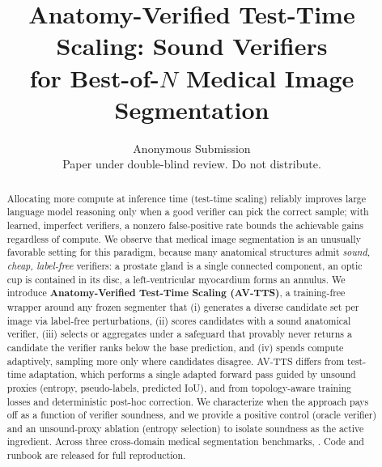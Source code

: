 \documentclass[10pt,twocolumn]{article}
\title{\vspace{-2.5em}\textbf{Anatomy-Verified Test-Time Scaling: Sound Verifiers\\ for Best-of-$N$ Medical Image Segmentation}}
\author{Anonymous Submission\\ \small Paper under double-blind review. Do not distribute.}
\date{}
\begin{document}
\maketitle

\begin{abstract}
Allocating more compute at inference time (test-time scaling) reliably improves large language model reasoning only when a good verifier can pick the correct sample; with learned, imperfect verifiers, a nonzero false-positive rate bounds the achievable gains regardless of compute. We observe that medical image segmentation is an unusually favorable setting for this paradigm, because many anatomical structures admit \emph{sound, cheap, label-free} verifiers: a prostate gland is a single connected component, an optic cup is contained in its disc, a left-ventricular myocardium forms an annulus. We introduce \textbf{Anatomy-Verified Test-Time Scaling (AV-TTS)}, a training-free wrapper around any frozen segmenter that (i) generates a diverse candidate set per image via label-free perturbations, (ii) scores candidates with a sound anatomical verifier, (iii) selects or aggregates under a safeguard that provably never returns a candidate the verifier ranks below the base prediction, and (iv) spends compute adaptively, sampling more only where candidates disagree. AV-TTS differs from test-time adaptation, which performs a single adapted forward pass guided by unsound proxies (entropy, pseudo-labels, predicted IoU), and from topology-aware training losses and deterministic post-hoc correction. We characterize when the approach pays off as a function of verifier soundness, and we provide a positive control (oracle verifier) and an unsound-proxy ablation (entropy selection) to isolate soundness as the active ingredient. Across three cross-domain medical segmentation benchmarks, . Code and runbook are released for full reproduction.
\end{abstract}
\end{document}
